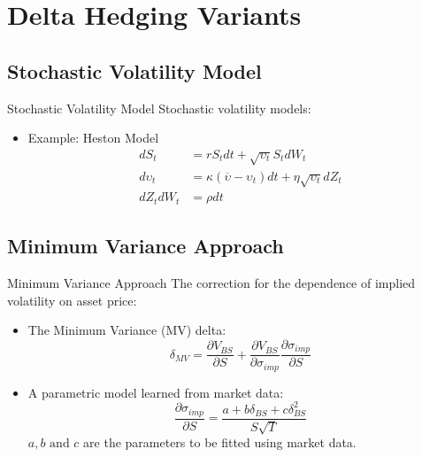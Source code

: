 \documentclass[10pt,table,mathserif]{beamer}
\begin{document}
\section{Delta Hedging Variants}
\subsection{Stochastic Volatility Model}
\begin{frame}{Stochastic Volatility Model}
Stochastic volatility models:
\begin{itemize}
  \item Example: Heston Model
\[
\begin{split}
dS_t&=r S_t dt + \sqrt{\upsilon_t} S_t dW_t\\
d\upsilon_t&=\kappa(\overline{\upsilon}-\upsilon_t)dt+\eta \sqrt{\upsilon_t}dZ_t\\
dZ_tdW_t&=\rho dt
\end{split}
\]
\end{itemize}
\end{frame}



\subsection{Minimum Variance Approach}
\begin{frame}{Minimum Variance Approach}
The correction for  the dependence of implied volatility on asset price:
\begin{itemize}
\item The Minimum Variance (MV) delta:
\[
\delta_{MV}=\frac{\partial V_{BS}}{\partial S}+\frac{\partial V_{BS}}{\partial \sigma_{imp}}\frac{\partial \sigma_{imp}}{ \partial S}
\]
\item A parametric model \footnotemark learned from market data:
\[
\frac{\partial \sigma_{imp}}{ \partial S}=\frac{a+b\delta_{BS}+c \delta_{BS}^2}{S\sqrt{T}}
\]
$a, b \text{ and  } c$ are the parameters to be fitted using market data.
\end{itemize}
\end{frame}
\end{document}
